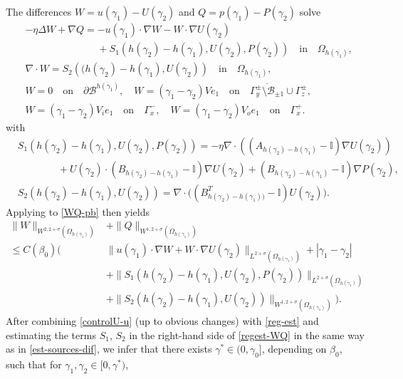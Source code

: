 \documentclass[11pt,a4paper]{amsart}
\theoremstyle{remark}
\theoremstyle{definition}
\numberwithin{equation}{section}
\numberwithin{proposition}{section}
\begin{document}
 The differences $W= u(\gamma_1)-U(\gamma_2)$ and $Q= p(\gamma_1)-P(\gamma_2)$ solve
\begin{equation}\label{WQ-pb}
		\begin{aligned}
		&-\eta\Delta  W +\nabla Q =
       - u(\gamma_1)\cdot \nabla W - W\cdot \nabla U(\gamma_2)\\[5pt]& \ \qquad \qquad \qquad \quad   + S_1\left(h(\gamma_2)- h(\gamma_1), U(\gamma_2), P(\gamma_2)\right)
        \quad\text{in}\quad \Omega_{h(\gamma_1)},  \\[5pt]
		&\nabla\cdot W =	S_2\left((h(\gamma_2)- h(\gamma_1), U(\gamma_2)\right)\quad\text{in}\quad \Omega_{h(\gamma_1)},\\[5pt]	&	W=0 \quad \text{on} \quad  \partial \mathcal{B}^{h(\gamma_1)},\quad W=(\gamma_1 - \gamma_2) Ve_1\quad \text{on} \quad \overline{\Gamma_{y}^\pm \setminus \mathcal{B}_{\pm 1}}\cup\Gamma_z^\pm,\\[5pt]
			&W= (\gamma_1 - \gamma_2) V_ie_1\quad \text{on} \quad \Gamma_x^-,\quad W = (\gamma_1 - \gamma_2) V_oe_1\quad\text{on} \quad \Gamma_x^+.
		\end{aligned}
\end{equation}
with
\begin{align*}
  &S_1\left(h(\gamma_2)- h(\gamma_1), U(\gamma_2), P(\gamma_2)\right)= - \eta \nabla \cdot \left((A_{h(\gamma_2)-h(\gamma_1)}- \mathbb{I})\nabla U(\gamma_2) \right)\\&\qquad \qquad+ U(\gamma_2)\cdot (B_{h(\gamma_2)- h(\gamma_1)} - \mathbb{I})\nabla U(\gamma_2)+ (B_{h(\gamma_2)- h(\gamma_1)}- \mathbb{I})\nabla P(\gamma_2),\\[5pt]
&S_2\left(h(\gamma_2)- h(\gamma_1), U(\gamma_2)\right)=
   \nabla\cdot \big((B_{h(\gamma_2)-h(\gamma_1))}^T- \mathbb{I})U(\gamma_2)\big).
\end{align*}
Applying \cite[Theorem 10.5.4]{Mazya-Rossmann2010} to \eqref{WQ-pb} then yields
\begin{equation}\label{regest-WQ}\begin{aligned}
   \|W\|_{W^{2, 2+\sigma}(\Omega_{h(\gamma_1)})}& + \|Q\|_{W^{1, 2+\sigma}(\Omega_{h(\gamma_1)})}\\[5pt]
\leq C(\beta_0)\bigg( &
  \|u(\gamma_1)\cdot \nabla W+ W\cdot \nabla U(\gamma_2)\|_{L^{2+\sigma}(\Omega_{h(\gamma_1)})}
+ |\gamma_1-\gamma_2|\\[5pt]&
+\|S_1\left(h(\gamma_2)- h(\gamma_1), U(\gamma_2), P(\gamma_2)\right)\|_{L^{2+\sigma}(\Omega_{h(\gamma_1)})} \\[5pt]&+\|S_2\left(h(\gamma_2)- h(\gamma_1), U(\gamma_2)\right)\|_{W^{1,2+\sigma}(\Omega_{h(\gamma_1)})}
\bigg).
\end{aligned}
\end{equation}
After combining \eqref{controlU-u} (up to obvious changes) with  \eqref{reg-est} and estimating the terms $S_1$, $S_2$ in the right-hand side of \eqref{regest-WQ} in the same way as in \eqref{est-sources-dif}, we infer that there exists $\gamma^*\in (0, \gamma_0]$, depending on $\beta_0$, such that for $\gamma_1, \gamma_2 \in [0, \gamma^*)$,
\end{document}
